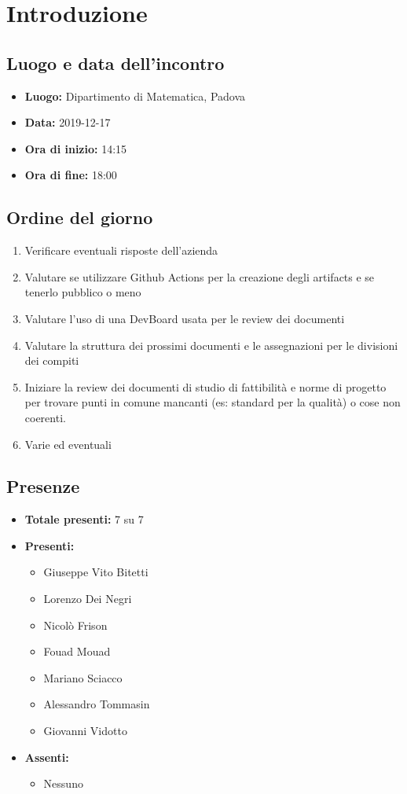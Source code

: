 \section*{Introduzione}

\subsection*{Luogo e data dell'incontro}
	\begin{itemize}
		\item \textbf{Luogo:} Dipartimento di Matematica, Padova
		\item \textbf{Data:} 2019-12-17
		\item \textbf{Ora di inizio:} 14:15
		\item \textbf{Ora di fine:} 18:00
	\end{itemize}

\subsection*{Ordine del giorno}
	\begin{enumerate}
		\item Verificare eventuali risposte dell'azienda
		\item Valutare se utilizzare Github Actions per la creazione degli artifacts e se tenerlo pubblico o meno
		\item Valutare l'uso di una DevBoard usata per le review dei documenti
		\item Valutare la struttura dei prossimi documenti e le assegnazioni per le divisioni dei compiti
		\item Iniziare la review dei documenti di studio di fattibilità e norme di progetto per trovare punti in comune mancanti (es: standard per la qualità) o cose non coerenti.
		\item Varie ed eventuali
	\end{enumerate}

\subsection*{Presenze}
	\begin{itemize}
		\item \textbf{Totale presenti:} 7 su 7
		\item \textbf{Presenti: }
			\begin{itemize}			
				\item Giuseppe Vito Bitetti
				\item Lorenzo Dei Negri
				\item Nicolò Frison
				\item Fouad Mouad
				\item Mariano Sciacco
				\item Alessandro Tommasin
				\item Giovanni Vidotto
			\end{itemize}
		\item \textbf{Assenti: } 
			\begin{itemize}	
				\item Nessuno
			\end{itemize}
	\end{itemize}


